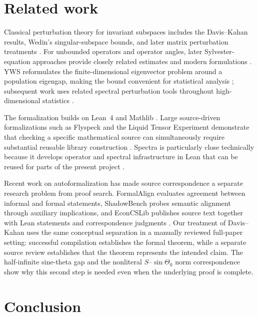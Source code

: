 \documentclass[11pt]{article}
\begin{document}
\section{Related work}
\label{sec:related}

Classical perturbation theory for invariant subspaces includes the
Davis--Kahan results, Wedin's singular-subspace bounds, and later matrix
perturbation treatments \citep{davis1970rotation,wedin1972perturbation,stewart1990matrix}.
For unbounded operators and operator angles, later Sylvester-equation approaches
provide closely related estimates and modern formulations
\citep{grubisic2005sylvester,grubisic2010tan}.  YWS reformulates the
finite-dimensional eigenvector problem around a population eigengap, making the
bound convenient for statistical analysis \citep{yu2015davis}; subsequent work
uses related spectral perturbation tools throughout high-dimensional statistics
\citep{cape2019two,chen2021spectral}.

The formalization builds on Lean~4 and Mathlib
\citep{demoura2021lean4,mathlib2020}.  Large source-driven formalizations such
as Flyspeck and the Liquid Tensor Experiment demonstrate that checking a
specific mathematical source can simultaneously require substantial reusable
library construction \citep{hales2017kepler,scholze2022liquid}.  Spectra is
particularly close technically because it develops operator and spectral
infrastructure in Lean that can be reused for parts of the present project
\citep{bornemann2026spectra}.

Recent work on autoformalization has made source correspondence a separate
research problem from proof search.  FormalAlign evaluates agreement between
informal and formal statements, ShadowBench probes semantic alignment through
auxiliary implications, and EconCSLib publishes source text together with Lean
statements and correspondence judgments
\citep{lu2025formalalign,han2026shadowbench,garg2026econcs}.  Our treatment of
Davis--Kahan uses the same conceptual separation in a manually reviewed
full-paper setting: successful compilation establishes the formal theorem, while
a separate source review establishes that the theorem represents the intended
claim.  The half-infinite sine-theta gap and the nonliteral
$S$--$\sin\Theta_0$ norm correspondence show why this second step is needed even
when the underlying proof is complete.

\section{Conclusion}
\label{sec:conclusion}
\end{document}

